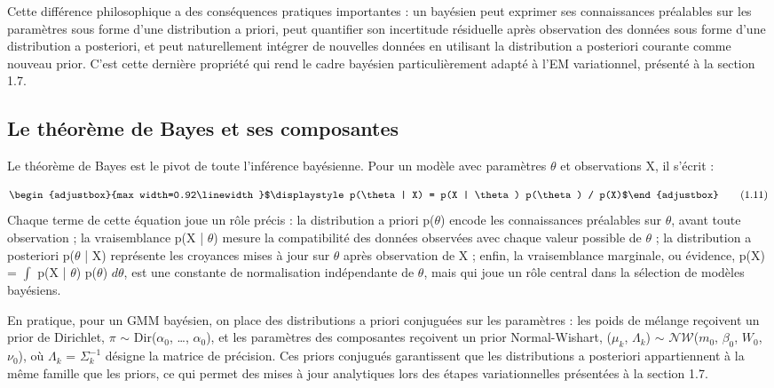 Cette différence philosophique a des conséquences pratiques importantes : un bayésien peut exprimer ses connaissances préalables sur les paramètres sous forme d'une distribution a priori, peut quantifier son incertitude résiduelle après observation des données sous forme d'une distribution a posteriori, et peut naturellement intégrer de nouvelles données en utilisant la distribution a posteriori courante comme nouveau prior. C'est cette dernière propriété qui rend le cadre bayésien particulièrement adapté à l'EM variationnel, présenté à la section 1.7.

\subsection{Le théorème de Bayes et ses composantes}
Le théorème de Bayes est le pivot de toute l'inférence bayésienne. Pour un modèle avec paramètres $\theta $ et observations X, il s'écrit :

\begin{equation}
\begin{adjustbox}{max width=0.92\linewidth}$\displaystyle p(\theta  | X) = p(X | \theta ) p(\theta ) / p(X)$\end{adjustbox}
\tag{1.11}
\label{eq:1_11}
\end{equation}
Chaque terme de cette équation joue un rôle précis : la distribution a priori p($\theta $) encode les connaissances préalables sur $\theta $, avant toute observation ; la vraisemblance p(X | $\theta $) mesure la compatibilité des données observées avec chaque valeur possible de $\theta $ ; la distribution a posteriori p($\theta $ | X) représente les croyances mises à jour sur $\theta $ après observation de X ; enfin, la vraisemblance marginale, ou évidence, p(X) = $\int $ p(X | $\theta $) p($\theta $) $d\theta $, est une constante de normalisation indépendante de $\theta $, mais qui joue un rôle central dans la sélection de modèles bayésiens.

En pratique, pour un GMM bayésien, on place des distributions a priori conjuguées sur les paramètres : les poids de mélange reçoivent un prior de Dirichlet, $\pi $ $\sim $ Dir($\alpha _{0}$, \ldots{}, $\alpha _{0}$), et les paramètres des composantes reçoivent un prior Normal-Wishart, ($\mu _{k}$, $\Lambda _{k}$) $\sim $ $\mathcal{N}\mathcal{W}$($m_{0}$, $\beta _{0}$, $W_{0}$, $\nu _{0}$), où $\Lambda _{k}$ = $\Sigma _{k}^{-1}$ désigne la matrice de précision. Ces priors conjugués garantissent que les distributions a posteriori appartiennent à la même famille que les priors, ce qui permet des mises à jour analytiques lors des étapes variationnelles présentées à la section 1.7.

